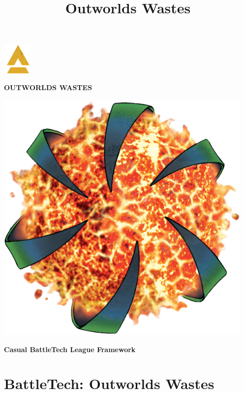 \documentclass{article}
\title{Outworlds Wastes}
\begin{document}
\begin{center}
  \fontsize{50}{60}\bfseries{}\includegraphics[width=0.6in,height=0.6in]{img/Battletech_A.png}\fontsize{50}{60}\bfseries{}

  \fontsize{35}{42}\bfseries\selectfont\MakeUppercase{Outworlds Wastes}

  \includegraphics[width=5in,height=5in]{img/Outworlds_Alliance.png}

  \LARGE\bfseries{Casual BattleTech League Framework}
\end{center}

\section{BattleTech: Outworlds Wastes}



\newpage

\tableofcontents
\end{document}
